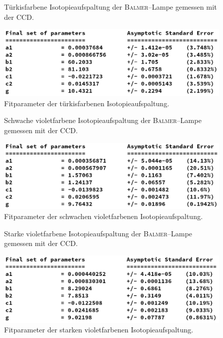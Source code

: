 \documentclass[sn-mathphys-num,iicol]{sn-jnl}
\theoremstyle{thmstyleone}
\theoremstyle{thmstyletwo}
\theoremstyle{thmstylethree}
\begin{document}
\begin{figure}[h]
        \centering
        \resizebox{.5\textwidth}{!}{}
        \caption{Türkisfarbene Isotopieaufspaltung der \textsc{Balmer}--Lampe gemessen mit der CCD.} \label{fig:ccdtürkis}
\end{figure}
\begin{figure}[h]
        \centering
        \includegraphics[width=.5\textwidth]{ccdtuerkis_params.png}
        \caption{Fitparameter der türkisfarbenen Isotopieaufspaltung.}
\end{figure}
\begin{figure}[h]
        \centering
        \resizebox{.5\textwidth}{!}{}
        \caption{Schwache violetfarbene Isotopieaufspaltung der \textsc{Balmer}--Lampe gemessen mit der CCD.} \label{fig:ccdvioletschwach}
\end{figure}
\begin{figure}[h]
        \centering
        \includegraphics[width=.5\textwidth]{ccdvioletschwach_params.png}
        \caption{Fitparameter der schwachen violetfarbenen Isotopieaufspaltung.}
\end{figure}
\begin{figure}[h]
        \centering
        \resizebox{.5\textwidth}{!}{}
        \caption{Starke violetfarbene Isotopieaufspaltung der \textsc{Balmer}--Lampe gemessen mit der CCD.} \label{fig:ccdvioletstark}
\end{figure}
\begin{figure}[h]
        \centering
        \includegraphics[width=.5\textwidth]{ccdvioletstark_params.png}
        \caption{Fitparameter der starken violetfarbenen Isotopieaufspaltung.}
\end{figure}

\clearpage

\end{document}
